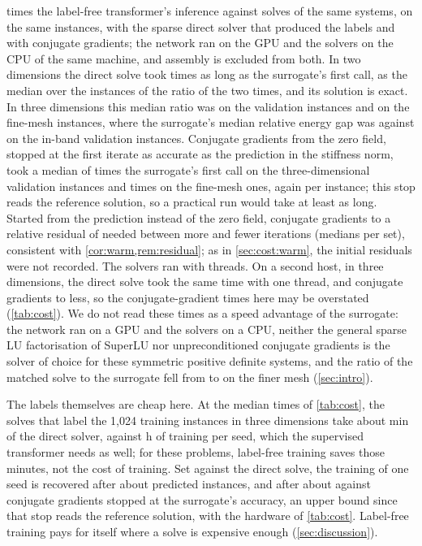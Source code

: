 times the label-free transformer's inference against solves of the same
systems, on the same instances, with the sparse direct solver that produced the labels and
with conjugate gradients; the network ran on the GPU and the solvers on the CPU of the same
machine, and assembly is excluded from both. In two dimensions the direct solve took
\numCostTwoDirectRatio{} times as long as the surrogate's first call, as the median over the
instances of the ratio of the two times, and its solution is exact. In three dimensions this
median ratio was \numCostThreeValDirectRatio{} on the validation instances and
\numCostThreeFineDirectRatio{} on the fine-mesh instances, where the surrogate's median
relative energy gap was \numCostThreeFineGap{} against \numCostThreeValGap{} on the in-band
validation instances. Conjugate gradients from the zero field, stopped at the first iterate
as accurate as the prediction in the stiffness norm, took a median of
\numCostThreeValMatchRatio{} times the surrogate's first call on the three-dimensional
validation instances and \numCostThreeFineMatchRatio{} times on the fine-mesh ones, again
per instance; this stop reads the reference solution, so a practical run would take at
least as long. Started from the prediction instead of the zero field, conjugate gradients to
a relative residual of \numCostCgTol{} needed between \numCostWarmMore{} more and
\numCostWarmFewer{} fewer iterations (medians per set), consistent with
\cref{cor:warm,rem:residual}; as in \cref{sec:cost:warm}, the initial residuals were not
recorded. The solvers ran with \numCostThreads{} threads. On a second host, in three
dimensions, the direct solve took the same time with one thread, and conjugate gradients
\numThreadsCgGainMin{} to \numThreadsCgGainMax{} less, so the conjugate-gradient times here
may be overstated (\cref{tab:cost}). We do not read these times as a speed advantage of the
surrogate: the network ran on a GPU and the solvers on a CPU, neither the general sparse LU
factorisation of SuperLU nor unpreconditioned conjugate gradients is the solver of choice
for these symmetric positive definite systems, and the ratio of the matched solve to the
surrogate fell from \numCostThreeValMatchRatio{} to \numCostThreeFineMatchRatio{} on the
finer mesh (\cref{sec:intro}).

The labels themselves are cheap here. At the median times of \cref{tab:cost}, the
\numThreeTrainSolves{} solves that label the 1,024 training instances in three dimensions
take about \numCostLabelMin{} min of the direct solver, against \numTimeThreeSeed{} h of
training per seed, which the supervised transformer needs as well; for these problems,
label-free training saves those minutes, not the cost of training. Set against the direct
solve, the training of one seed is recovered after about \numCostBreakEvenDirect{}
predicted instances, and after about \numCostBreakEvenMatch{} against conjugate gradients
stopped at the surrogate's accuracy, an upper bound since that stop reads the reference
solution, with the hardware of \cref{tab:cost}. Label-free
training pays for itself where a solve is expensive enough (\cref{sec:discussion}).
